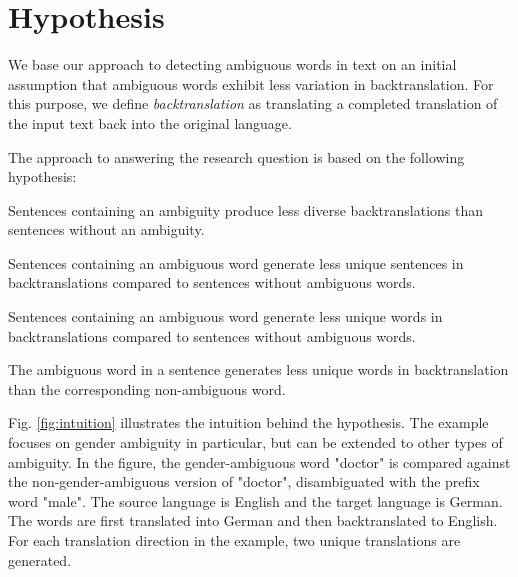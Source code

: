 \section{Hypothesis}
\label{sec:Methodology:Hypothesis}
We base our approach to detecting ambiguous words in text on an initial assumption that ambiguous words exhibit less variation in backtranslation.  For this purpose, we define \textit{backtranslation} as translating a completed translation of the input text back into the original language.  

The approach to answering the research question is based on the following hypothesis:

\begin{hyp}\label{main}
Sentences containing an ambiguity produce less diverse backtranslations than sentences without an ambiguity.
\end{hyp}

\setcounter{subhyp}{0}


\begin{subhyp}[a]\label{a}
Sentences containing an ambiguous word generate less unique sentences in backtranslations compared to sentences without ambiguous words.
\end{subhyp}

\begin{subhyp}[b]\label{b}
Sentences containing an ambiguous word generate less unique words in backtranslations compared to sentences without ambiguous words.
\end{subhyp}

\begin{subhyp}[c]\label{c}
The ambiguous word in a sentence generates less unique words in backtranslation than the corresponding non-ambiguous word.
\end{subhyp}


Fig. \ref{fig:intuition} illustrates the intuition behind the hypothesis. The example focuses on gender ambiguity in particular, but can be extended to other types of ambiguity. In the figure, the gender-ambiguous word "doctor" is compared against the non-gender-ambiguous version of "doctor", disambiguated with the prefix word "male". The source language is English and the target language is German. The words are first translated into German and then backtranslated to English. For each translation direction in the example, two unique translations are generated. 

